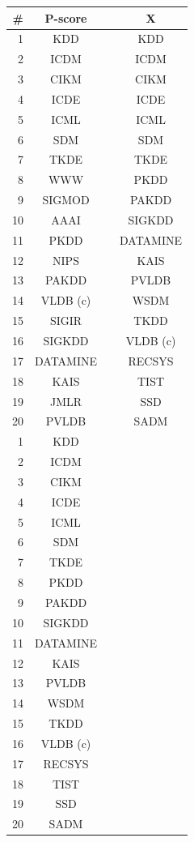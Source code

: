 \begin{table}[htbp]
\begin{tabular}{rccc}
\#		&		P-score		& &		X			\\ \hline
1		&		KDD			& &		KDD			\\
2		&		ICDM		& &		ICDM		\\
3		&		CIKM		& &		CIKM		\\
4		&		ICDE		& &		ICDE		\\
5		&		ICML		& &		ICML		\\
6		&		SDM			& &		SDM			\\
7		&		TKDE		& &		TKDE		\\
8		&		WWW			& &		PKDD		\\
9		&		SIGMOD		& &		PAKDD		\\
10		&		AAAI		& &		SIGKDD		\\
11		&		PKDD		& &		DATAMINE	\\
12		&		NIPS		& &		KAIS		\\
13		&		PAKDD		& &		PVLDB		\\
14		&		VLDB (c)	& &		WSDM		\\
15		&		SIGIR		& &		TKDD		\\
16		&		SIGKDD		& &		VLDB (c)	\\
17		&		DATAMINE	& &		RECSYS		\\
18		&		KAIS		& &		TIST		\\
19		&		JMLR		& &		SSD			\\
20		&		PVLDB		& &		SADM		\\

1		&		KDD			\\
2		&		ICDM		\\
3		&		CIKM		\\
4		&		ICDE		\\
5		&		ICML		\\
6		&		SDM			\\
7		&		TKDE		\\
8		&		PKDD		\\
9		&		PAKDD		\\
10		&		SIGKDD		\\
11		&		DATAMINE	\\
12		&		KAIS		\\
13		&		PVLDB		\\
14		&		WSDM		\\
15		&		TKDD		\\
16		&		VLDB (c)	\\
17		&		RECSYS		\\
18		&		TIST		\\
19		&		SSD			\\
20		&		SADM		\\

\end{tabular}
\end{table}














